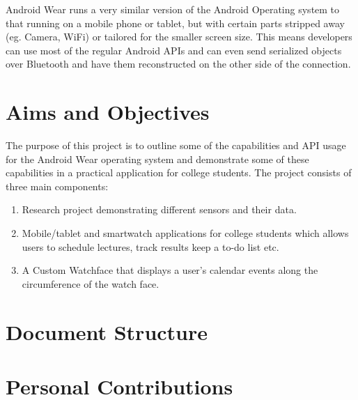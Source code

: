 Android Wear runs a very similar version of the Android Operating system to
that running on a mobile phone or tablet, but with certain parts stripped away
(eg. Camera, WiFi) or tailored for the smaller screen size. This means
developers can use most of the regular Android APIs and can even send
serialized objects over Bluetooth and have them reconstructed on the other side
of the connection.

\section{Aims and Objectives}

The purpose of this project is to outline some of the capabilities and API
usage for the Android Wear operating system and demonstrate some of these
capabilities in a practical application for college students. The project
consists of three main components:

\begin{enumerate}

\item Research project demonstrating different sensors and their data.
\item Mobile/tablet and smartwatch applications for college students which
    allows users to schedule lectures, track results keep a to-do list etc.
\item A Custom Watchface that displays a user's calendar events along the
    circumference of the watch face.

\end{enumerate}

\section{Document Structure}
\section{Personal Contributions}
